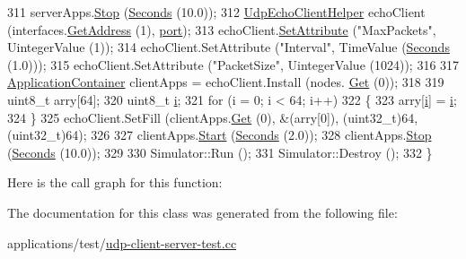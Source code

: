 \begin{DoxyCode}
311   serverApps.\hyperlink{classns3_1_1ApplicationContainer_adfc52f9aa4020c8714679b00bbb9ddb3}{Stop} (\hyperlink{group__timecivil_ga33c34b816f8ff6628e33d5c8e9713b9e}{Seconds} (10.0));
312   \hyperlink{classns3_1_1UdpEchoClientHelper}{UdpEchoClientHelper} echoClient (interfaces.\hyperlink{classns3_1_1Ipv4InterfaceContainer_ae63208dcd222be986822937ee4aa828c}{GetAddress} (1), 
      \hyperlink{dsdv-manet_8cc_a8e0798404bf2cf5dabb84c5ba9a4f236}{port});
313   echoClient.\hyperlink{classns3_1_1UdpEchoClientHelper_a11228c069ad896f8ed13f4d37c13f51d}{SetAttribute} (\textcolor{stringliteral}{"MaxPackets"}, UintegerValue (1));
314   echoClient.SetAttribute (\textcolor{stringliteral}{"Interval"}, TimeValue (\hyperlink{group__timecivil_ga33c34b816f8ff6628e33d5c8e9713b9e}{Seconds} (1.0)));
315   echoClient.SetAttribute (\textcolor{stringliteral}{"PacketSize"}, UintegerValue (1024));
316 
317   \hyperlink{classns3_1_1ApplicationContainer}{ApplicationContainer} clientApps = echoClient.Install (nodes.
      \hyperlink{classns3_1_1NodeContainer_a9ed96e2ecc22e0f5a3d4842eb9bf90bf}{Get} (0));
318 
319   uint8\_t arry[64];
320   uint8\_t \hyperlink{bernuolliDistribution_8m_a6f6ccfcf58b31cb6412107d9d5281426}{i};
321   \textcolor{keywordflow}{for} (i = 0; i < 64; i++)
322     \{
323       arry[\hyperlink{bernuolliDistribution_8m_a6f6ccfcf58b31cb6412107d9d5281426}{i}] = \hyperlink{bernuolliDistribution_8m_a6f6ccfcf58b31cb6412107d9d5281426}{i};
324     \}
325   echoClient.SetFill (clientApps.\hyperlink{classns3_1_1ApplicationContainer_a9e565807abd4213a56566a7ccd8d7509}{Get} (0), &(arry[0]), (uint32\_t)64, (uint32\_t)64);
326 
327   clientApps.\hyperlink{classns3_1_1ApplicationContainer_a8eff87926507020bbe3e1390358a54a7}{Start} (\hyperlink{group__timecivil_ga33c34b816f8ff6628e33d5c8e9713b9e}{Seconds} (2.0));
328   clientApps.\hyperlink{classns3_1_1ApplicationContainer_adfc52f9aa4020c8714679b00bbb9ddb3}{Stop} (\hyperlink{group__timecivil_ga33c34b816f8ff6628e33d5c8e9713b9e}{Seconds} (10.0));
329 
330   Simulator::Run ();
331   Simulator::Destroy ();
332 \}
\end{DoxyCode}


Here is the call graph for this function\+:




The documentation for this class was generated from the following file\+:\begin{DoxyCompactItemize}
\item 
applications/test/\hyperlink{udp-client-server-test_8cc}{udp-\/client-\/server-\/test.\+cc}\end{DoxyCompactItemize}
